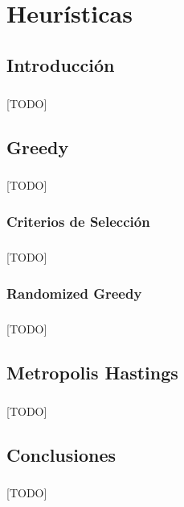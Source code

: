 \documentclass{subfiles}
\begin{document}
  \chapter{Heurísticas}
  \label{chap:heuristics}

    \section{Introducción}
    \label{sec:heuristics_introduction}

      \paragraph{}
      [TODO]

    \section{Greedy}
    \label{sec:heuristics_greedy}

      \paragraph{}
      [TODO]

      \subsection{Criterios de Selección}
      \label{sec:heuristics_greedy_criterions}

        \paragraph{}
        [TODO]

      \subsection{Randomized Greedy}
      \label{sec:heuristics_randomized_greedy}

        \paragraph{}
        [TODO]

    \section{Metropolis Hastings}
    \label{sec:heuristics_greedy}

      \paragraph{}
      [TODO]

    \section{Conclusiones}
    \label{sec:heuristics_conclusions}

      \paragraph{}
      [TODO]
\end{document}
